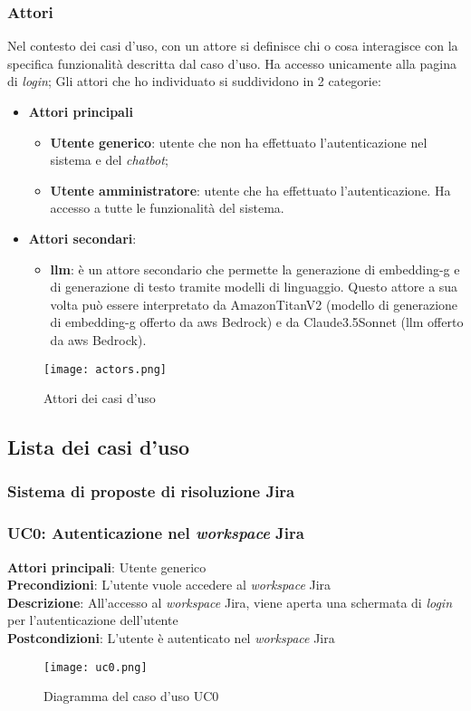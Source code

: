 \subsubsection{Attori}
Nel contesto dei casi d'uso, con un attore si definisce chi o cosa interagisce con la specifica funzionalità descritta dal caso d'uso. Ha accesso unicamente alla pagina di \textit{login}; 
Gli attori che ho individuato si suddividono in 2 categorie:
\begin{itemize}
    \item \textbf{Attori principali} \begin{itemize} \item \textbf{Utente generico}: utente che non ha effettuato l'autenticazione nel sistema e del \textit{chatbot}; \item \textbf{Utente amministratore}: utente che ha effettuato l'autenticazione. Ha accesso a tutte le funzionalità del sistema.
    \end{itemize}
    \item \textbf{Attori secondari}: \begin{itemize} \item \textbf{\gls{llm}}: è un attore secondario che permette la generazione di \gls{embedding-g} e di generazione di testo tramite modelli di linguaggio. Questo attore a sua volta può essere interpretato da AmazonTitanV2 (modello di generazione di \gls{embedding-g} offerto da \gls{aws} Bedrock) e da Claude3.5Sonnet (\gls{llm} offerto da \gls{aws} Bedrock).
    \end{itemize}
\end{itemize}
\begin{figure}[H]
    \centering
    \texttt{[image: actors.png]}
    \caption{Attori dei casi d'uso}
    \label{fig:attori}
\end{figure}
\subsection*{Lista dei casi d'uso}
\subsubsection{Sistema di proposte di risoluzione Jira}
\subsubsection{UC0: Autenticazione nel \textit{workspace} Jira} 
\textbf{Attori principali}: Utente generico \\
\textbf{Precondizioni}: L'utente vuole accedere al \textit{workspace} Jira \\
\textbf{Descrizione}: All'accesso al \textit{workspace} Jira, viene aperta una schermata di \textit{login} per l'autenticazione dell'utente \\
\textbf{Postcondizioni}: L'utente è autenticato nel \textit{workspace} Jira \\
\begin{figure}[H]
    \centering
    \texttt{[image: uc0.png]}
    \caption{Diagramma del caso d'uso UC0}
    \label{fig:UC0}
\end{figure}
